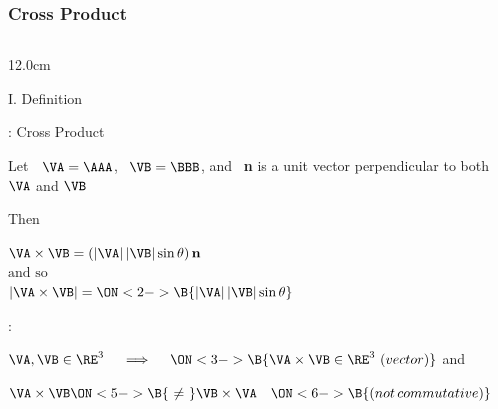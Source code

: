 \begin{frame}
\frametitle{Cross Product}
\begin{columns}
\begin{column}{12.0cm}

{I. Definition}

\vspace{0.2cm}

\scriptsize
	
: Cross Product

\vspace{0.3cm}

Let \,\, $\VA = \AAA$, \, $\VB = \BBB$, and \, {\bf n} is a unit vector perpendicular to both $\VA$ and $\VB$

\vspace{0.3cm}

Then 
\begin{center}
	$\VA \times \VB = (|\VA|\,|\VB|\sin \theta) \, {\bf n}$ \\
	\vspace{0.2cm}
	$\text{and so}$\\
	\vspace{0.2cm}
	$|\VA \times \VB| = \ON<2->{\B{|\VA|\,|\VB|\sin \theta}}$
\end{center}

\vspace{0.2cm}

:

\vspace{0.1cm}

\OBUL $\VA,\VB \in \RE^3 \quad \implies \quad 
\ON<3->{\B{\VA \times \VB \in \RE^3 \,\, (vector)}}$ and \,\,
\\

\vspace{0.2cm}

\OBUL $\VA \times \VB 
\ON<5->{\B{\,\,\ne\,\,}} \VB \times \VA \quad 
\ON<6->{\B{(not \, commutative)}}$ 

\vspace{0.2cm}


\end{column}
\end{columns}
\end{frame}
